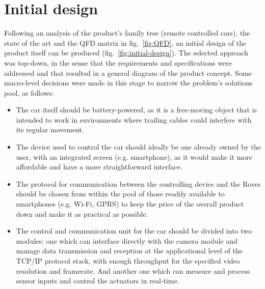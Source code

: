 \section{Initial design}%
\label{sec:org68fdd80}

Following an analysis of the product’s family tree (remote controlled cars), the state of the art and the QFD matrix in fig.~\ref{fig:QFD}, an initial design of the product itself can be produced (fig.~\ref{fig:initial-design}).
The selected approach was top-down, in the sense that the requirements and specifications were addressed and that resulted in a general diagram of the product concept. Some macro-level decisions were made in this stage to narrow the problem’s solutions pool, as follows:

\begin{itemize}
\item  The car itself should be battery-powered, as it is a free-moving object that is intended to work in environments where trailing cables could interfere with its regular movement.

\item The device used to control the car should ideally be one already owned by the user, with an integrated screen (e.g. smartphone), as it would make it more affordable and have a more straightforward interface.

\item The protocol for communication between the controlling device and the Rover should be chosen from within the pool of those readily available to smartphones (e.g. Wi-Fi, GPRS) to keep the price of the overall product down and make it as practical as possible.

\item  The control and communication unit for the car should be divided into two modules: one which can interface directly with the camera module and manage data transmission and reception at the applicational level of the TCP/IP protocol stack, with enough throughput for the specified video resolution and framerate. And another one which can measure and process sensor inputs and control the actuators in real-time.

\end{itemize}

